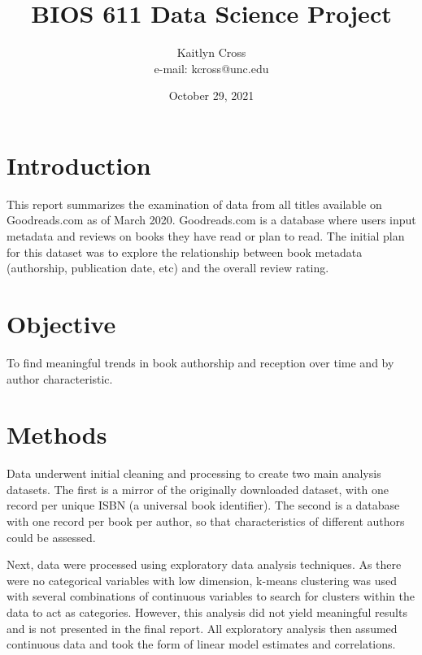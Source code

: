 \documentclass{article}
\begin{document}
\title{BIOS 611 Data Science Project}
\author{Kaitlyn Cross \\ e-mail: kcross@unc.edu}
\date{October 29, 2021}
\maketitle
\section{Introduction}
This report summarizes the examination of data from all titles available on Goodreads.com as of March 2020. Goodreads.com is a database where users input metadata and reviews on books they have read or plan to read. The initial plan for this dataset was to explore the relationship between book metadata (authorship, publication date, etc) and the overall review rating.
\section{Objective}
To find meaningful trends in book authorship and reception over time and by author characteristic.
\section{Methods}
Data underwent initial cleaning and processing to create two main analysis datasets. The first is a mirror of the originally downloaded dataset, with one record per unique ISBN (a universal book identifier). The second is a database with one record per book per author, so that characteristics of different authors could be assessed.

Next, data were processed using exploratory data analysis techniques. As there were no categorical variables with low dimension, k-means clustering was used with several combinations of continuous variables to search for clusters within the data to act as categories. However, this analysis did not yield meaningful results and is not presented in the final report. All exploratory analysis then assumed continuous data and took the form of linear model estimates and correlations.
\end{document}
